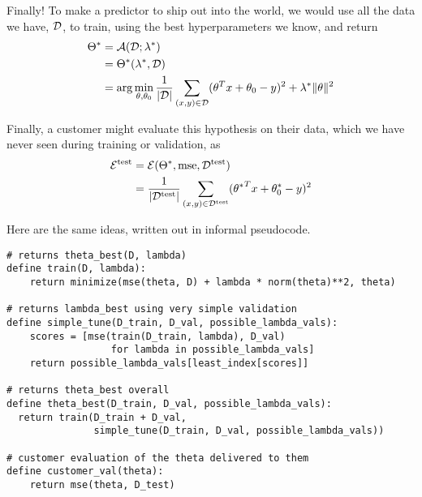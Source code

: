 Finally!  To make a predictor to ship out into the world, we would use
all the data we have, ${\cal D}$, to train, using the best
hyperparameters we know, and return
\begin{align*}
  \Theta^* & = \mathcal{A}({\cal D}; \lambda^*)     \\
           & = \Theta^*(\lambda^*, {\cal D}) \\
           & = {\rm arg}\min_{\theta, \theta_0}
  \frac{1}{|{\cal D}|} \sum_{(x, y) \in {\cal D}} (\theta^Tx +
  \theta_0 - y)^2 + \lambda^*\|\theta\|^2 \\
\end{align*}

Finally, a customer might evaluate this hypothesis on their data,
which we have never seen during training or validation, as
\begin{align*}
  \mathcal{E}^\text{test} & = \mathcal{E}(\Theta^*, \text{mse},
  {\cal D}^\text{test})                                                                                             \\
                          & = \frac{1}{|{\cal D}^\text{test}|} \sum_{(x, y) \in {\cal D}^\text{test}} ({\theta^*}^Tx +
  \theta_0^* - y)^2                                                                                              \\
\end{align*}

Here are the same ideas, written out in informal pseudocode.
\begin{verbatim}
# returns theta_best(D, lambda)
define train(D, lambda):
    return minimize(mse(theta, D) + lambda * norm(theta)**2, theta)

# returns lambda_best using very simple validation
define simple_tune(D_train, D_val, possible_lambda_vals):
    scores = [mse(train(D_train, lambda), D_val)
                  for lambda in possible_lambda_vals]
    return possible_lambda_vals[least_index[scores]]

# returns theta_best overall
define theta_best(D_train, D_val, possible_lambda_vals):
  return train(D_train + D_val, 
               simple_tune(D_train, D_val, possible_lambda_vals))

# customer evaluation of the theta delivered to them
define customer_val(theta):
    return mse(theta, D_test)

\end{verbatim}


